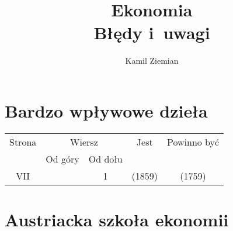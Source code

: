 \documentclass[a4paper,11pt]{article}
\title{Ekonomia \\
  {\Large Błędy i~uwagi}}
\author{Kamil Ziemian}
\begin{document}





\maketitle %





\section{Bardzo wpływowe dzieła}

\vspace{\spaceTwo}







\begin{center}

  \begin{tabular}{|c|c|c|c|c|}
    \hline
    Strona & \multicolumn{2}{c|}{Wiersz} & Jest
                              & Powinno być \\ \cline{2-3}
    & Od góry & Od dołu & & \\
    \hline
    VII & & 1 & (1859) & (1759) \\
    \hline
  \end{tabular}

\end{center}

\vspace{\spaceOne}












\section{Austriacka szkoła ekonomii}
\end{document}
